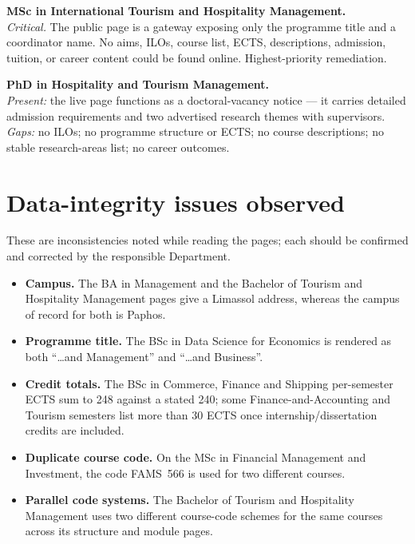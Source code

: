 \documentclass[11pt,a4paper]{article}
\begin{document}
\textbf{MSc in International Tourism and Hospitality Management.}\\
\emph{Critical.} The public page is a gateway exposing only the programme title and a coordinator name. No aims, ILOs, course list, ECTS, descriptions, admission, tuition, or career content could be found online. Highest-priority remediation.

\textbf{PhD in Hospitality and Tourism Management.}\\
\emph{Present:} the live page functions as a doctoral-vacancy notice --- it carries detailed admission requirements and two advertised research themes with supervisors.\\
\emph{Gaps:} no ILOs; no programme structure or ECTS; no course descriptions; no stable research-areas list; no career outcomes.

\section{Data-integrity issues observed}

These are inconsistencies noted while reading the pages; each should be confirmed and corrected by the responsible Department.

\begin{itemize}
  \item \textbf{Campus.} The BA in Management and the Bachelor of Tourism and Hospitality Management pages give a Limassol address, whereas the campus of record for both is Paphos.
  \item \textbf{Programme title.} The BSc in Data Science for Economics is rendered as both ``\ldots and Management'' and ``\ldots and Business''.
  \item \textbf{Credit totals.} The BSc in Commerce, Finance and Shipping per-semester ECTS sum to 248 against a stated 240; some Finance-and-Accounting and Tourism semesters list more than 30 ECTS once internship/dissertation credits are included.
  \item \textbf{Duplicate course code.} On the MSc in Financial Management and Investment, the code FAMS~566 is used for two different courses.
  \item \textbf{Parallel code systems.} The Bachelor of Tourism and Hospitality Management uses two different course-code schemes for the same courses across its structure and module pages.
\end{itemize}
\end{document}
